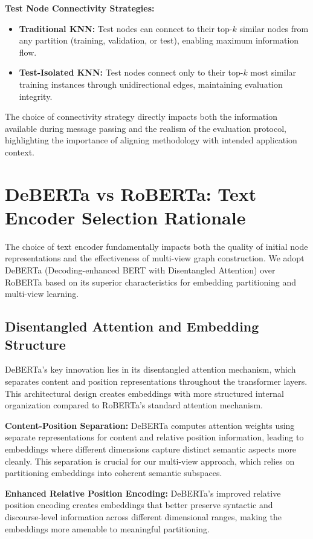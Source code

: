 \textbf{Test Node Connectivity Strategies:}
\begin{itemize}
    \item \textbf{Traditional KNN:} Test nodes can connect to their top-$k$ similar nodes from any partition (training, validation, or test), enabling maximum information flow.
    \item \textbf{Test-Isolated KNN:} Test nodes connect only to their top-$k$ most similar training instances through unidirectional edges, maintaining evaluation integrity.
\end{itemize}

The choice of connectivity strategy directly impacts both the information available during message passing and the realism of the evaluation protocol, highlighting the importance of aligning methodology with intended application context.

\section{DeBERTa vs RoBERTa: Text Encoder Selection Rationale}

The choice of text encoder fundamentally impacts both the quality of initial node representations and the effectiveness of multi-view graph construction. We adopt DeBERTa (Decoding-enhanced BERT with Disentangled Attention) over RoBERTa based on its superior characteristics for embedding partitioning and multi-view learning.

\subsection{Disentangled Attention and Embedding Structure}

DeBERTa's key innovation lies in its disentangled attention mechanism, which separates content and position representations throughout the transformer layers. This architectural design creates embeddings with more structured internal organization compared to RoBERTa's standard attention mechanism.

\textbf{Content-Position Separation:} DeBERTa computes attention weights using separate representations for content and relative position information, leading to embeddings where different dimensions capture distinct semantic aspects more cleanly. This separation is crucial for our multi-view approach, which relies on partitioning embeddings into coherent semantic subspaces.

\textbf{Enhanced Relative Position Encoding:} DeBERTa's improved relative position encoding creates embeddings that better preserve syntactic and discourse-level information across different dimensional ranges, making the embeddings more amenable to meaningful partitioning.

